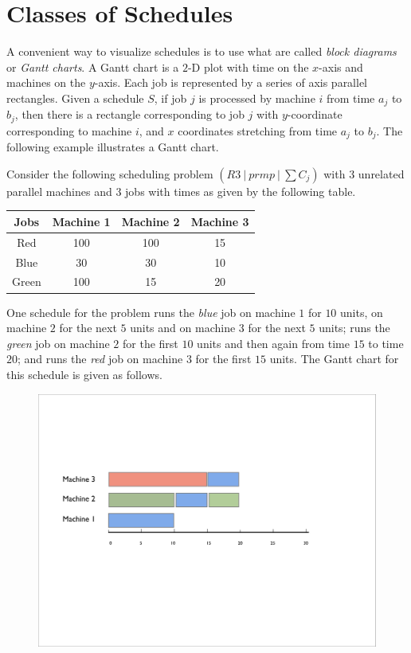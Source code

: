 \documentclass[11pt]{article}
\begin{document}
\MakeScribeTop

\section{Classes of Schedules}
A convenient way to visualize schedules is to use what are called {\em block diagrams} or {\em Gantt charts}.
A Gantt chart is a $2$-D plot  with time on the $x$-axis and machines on the $y$-axis. Each job is represented by a series of axis parallel rectangles. Given a schedule $S$, if job $j$ is processed by machine $i$ from time $a_j$ to $b_j$, then there is a rectangle corresponding to job $j$ with $y$-coordinate corresponding to machine $i$, and $x$ coordinates stretching from time $a_j$ to $b_j$. The following example illustrates a Gantt chart.

\begin{example}
Consider the following scheduling problem $(R3~|~prmp~|~\sum C_j)$ with $3$ unrelated parallel machines and $3$ jobs with times as given by the following table.
\begin{center}
\begin{tabular}{|c||c|c|c|}\hline
Jobs & Machine 1 & Machine 2 & Machine 3 \\ \hline
Red & 100 & 100 & 15\\
Blue & 30 & 30 & 10\\
Green & 100 & 15 & 20\\
\hline
\end{tabular}
\end{center}
\vspace{0.1in}
One schedule for the problem runs the {\em blue} job on machine $1$ for $10$ units, on machine $2$ for the next $5$ units and on machine $3$ for the next $5$ units; runs the {\em green} job on machine $2$ for the first $10$ units and then again from time $15$ to time $20$; and runs the {\em red} job on machine $3$ for the first $15$ units. The Gantt chart for this schedule is given as follows.

\begin{figure}[h]
\begin{center}
\includegraphics[scale=0.4]{Gantt}
\end{center}
\end{figure}
\end{example} 
\end{document}

